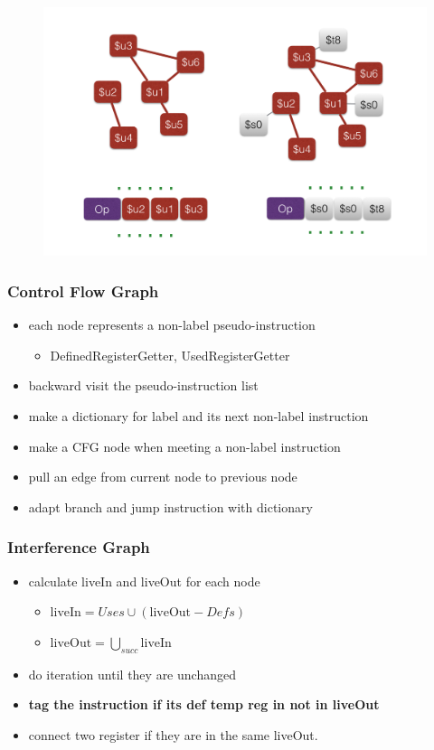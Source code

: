 \documentclass{beamer}
\begin{document}
\begin{frame}
	\begin{figure}
		\centering
		\includegraphics[width = \textwidth]{ra_2}
	\end{figure}
\end{frame}

\begin{frame}\frametitle{Control Flow Graph}
	\begin{itemize}
		\item each node represents a non-label pseudo-instruction
			\begin{itemize}
				\item DefinedRegisterGetter, UsedRegisterGetter
			\end{itemize}
		\item backward visit the pseudo-instruction list
		\item make a dictionary for label and its next non-label instruction
		\item make a CFG node when meeting a non-label instruction
		\item pull an edge from current node to previous node
		\item adapt branch and jump instruction with dictionary
	\end{itemize}
\end{frame}

\begin{frame}\frametitle{Interference Graph}
	\begin{itemize}
		\item calculate liveIn and liveOut for each node
			\begin{itemize}
				\item $\text{liveIn} = Uses \cup (\text{liveOut} - Defs)$
				\item $\text{liveOut} = \bigcup_{succ}\text{liveIn}$
			\end{itemize}
		\item do iteration until they are unchanged
		\item \textbf{tag the instruction if its def temp reg in not in liveOut}
		\item connect two register if they are in the same liveOut.
	\end{itemize}
\end{frame}
\end{document}
